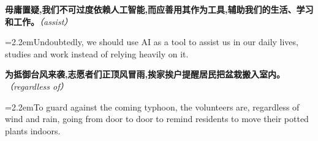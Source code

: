 \documentclass[11pt,a4paper]{article}
\newcommand{\num}[1]{\makebox[1.9em][r]{#1.}\hspace{0.3em}}
\newcommand{\prompt}[1]{\emph{\textcolor{tipblue}{\small（#1）}}}
\begin{document}
\begin{minipage}{\linewidth}

\num{7}\textbf{毋庸置疑,我们不可过度依赖人工智能,而应善用其作为工具,辅助我们的生活、学习和工作。}\prompt{assist}

\vspace{0.15em}

\noindent\hangindent=2.2em\hspace{2.2em}Undoubtedly, we should use AI as a tool to assist us in our daily lives, studies and work instead of relying heavily on it.

\end{minipage}

\begin{minipage}{\linewidth}

\num{8}\textbf{为抵御台风来袭,志愿者们正顶风冒雨,挨家挨户提醒居民把盆栽搬入室内。}\prompt{regardless of}

\vspace{0.15em}

\noindent\hangindent=2.2em\hspace{2.2em}To guard against the coming typhoon, the volunteers are, regardless of wind and rain, going from door to door to remind residents to move their potted plants indoors.

\end{minipage}
\end{document}

